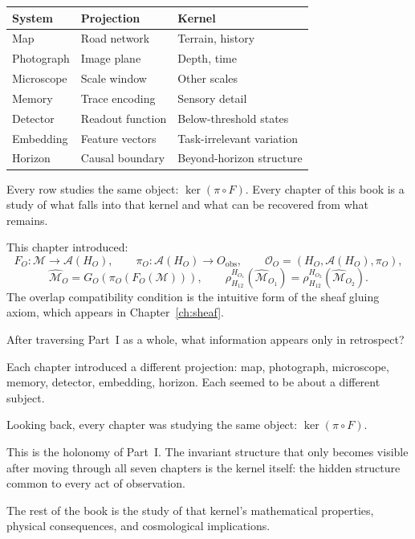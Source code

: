 \begin{CrossDomain}
  \begin{center}
  \begin{tabular}{@{}lll@{}}
    \toprule
    \textbf{System} & \textbf{Projection} & \textbf{Kernel} \\
    \midrule
    Map & Road network & Terrain, history \\
    Photograph & Image plane & Depth, time \\
    Microscope & Scale window & Other scales \\
    Memory & Trace encoding & Sensory detail \\
    Detector & Readout function & Below-threshold states \\
    Embedding & Feature vectors & Task-irrelevant variation \\
    Horizon & Causal boundary & Beyond-horizon structure \\
    \bottomrule
  \end{tabular}
  \end{center}

  Every row studies the same object: $\ker(\pi \circ F)$.
  Every chapter of this book is a study of what falls into
  that kernel and what can be recovered from what remains.
\end{CrossDomain}

\begin{MathEcho}
  This chapter introduced:
  \[
    F_O : \mathcal{M} \to \mathcal{A}(H_O),
    \qquad
    \pi_O : \mathcal{A}(H_O) \to O_{\mathrm{obs}},
    \qquad
    \mathcal{O}_O = (H_O, \mathcal{A}(H_O), \pi_O),
  \]
  \[
    \widehat{\mathcal{M}}_O = G_O(\pi_O(F_O(\mathcal{M}))),
    \qquad
    \rho^{H_{O_1}}_{H_{12}}(\widehat{\mathcal{M}}_{O_1})
    = \rho^{H_{O_2}}_{H_{12}}(\widehat{\mathcal{M}}_{O_2}).
  \]
  The overlap compatibility condition is the intuitive form
  of the sheaf gluing axiom, which appears in
  Chapter~\ref{ch:sheaf}.
\end{MathEcho}

\begin{HolonomyNote}
  After traversing Part~I as a whole, what information appears
  only in retrospect?

  Each chapter introduced a different projection:
  map, photograph, microscope, memory, detector, embedding,
  horizon.
  Each seemed to be about a different subject.

  Looking back, every chapter was studying the same object:
  $\ker(\pi \circ F)$.

  This is the holonomy of Part~I\@.
  The invariant structure that only becomes visible after
  moving through all seven chapters is the kernel itself:
  the hidden structure common to every act of observation.

  The rest of the book is the study of that kernel's
  mathematical properties, physical consequences, and
  cosmological implications.
\end{HolonomyNote}

